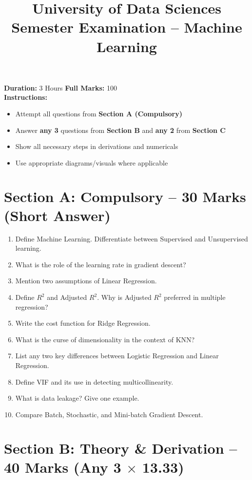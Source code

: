 \documentclass[12pt]{article}
\title{\textbf{University of Data Sciences} \\ \vspace{0.5em} \Large Semester Examination – Machine Learning}
\date{}
\begin{document}
\maketitle
\vspace{-1em}
\noindent\textbf{Duration:} 3 Hours \hfill \textbf{Full Marks:} 100\\
\textbf{Instructions:}
\begin{itemize}
  \item Attempt all questions from \textbf{Section A (Compulsory)}
  \item Answer \textbf{any 3} questions from \textbf{Section B} and \textbf{any 2} from \textbf{Section C}
  \item Show all necessary steps in derivations and numericals
  \item Use appropriate diagrams/visuals where applicable
\end{itemize}

\section*{Section A: Compulsory – 30 Marks (Short Answer)}
\begin{enumerate}[label=\arabic*.]
    \item Define Machine Learning. Differentiate between Supervised and Unsupervised learning.
    \item What is the role of the learning rate in gradient descent?
    \item Mention two assumptions of Linear Regression.
    \item Define $R^2$ and Adjusted $R^2$. Why is Adjusted $R^2$ preferred in multiple regression?
    \item Write the cost function for Ridge Regression.
    \item What is the curse of dimensionality in the context of KNN?
    \item List any two key differences between Logistic Regression and Linear Regression.
    \item Define VIF and its use in detecting multicollinearity.
    \item What is data leakage? Give one example.
    \item Compare Batch, Stochastic, and Mini-batch Gradient Descent.
\end{enumerate}

\section*{Section B: Theory \& Derivation – 40 Marks (Any 3 $\times$ 13.33)}
\end{document}
